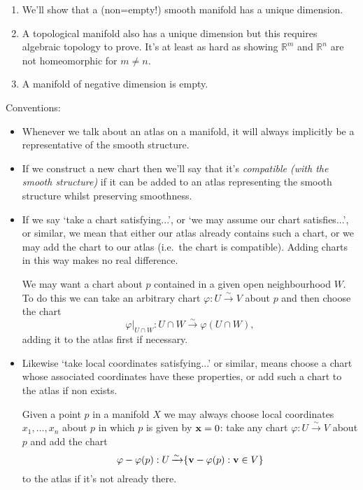\documentclass[a4paper,11pt]{article}
\begin{document}
	\begin{rmk}
		\begin{enumerate}
			\item We'll show that a (non=empty!) smooth manifold has a unique dimension.
			\item A topological manifold also has a unique dimension but this requires algebraic topology to prove. It's at least as hard as showing $\mathbb{R}^m$ and $\mathbb{R}^n$ are not homeomorphic for $m \neq n$.
			\item A manifold of negative dimension is empty.
		\end{enumerate}
	\end{rmk}

	Conventions:
	\begin{itemize}
		\item Whenever we talk about an atlas on a manifold, it will always implicitly be a representative of the smooth structure.
		\item If we construct a new chart then we'll say that it's \emph{compatible (with the smooth structure)} if it can be added to an atlas representing the smooth structure whilst preserving smoothness.
		\item If we say `take a chart satisfying...', or `we may assume our chart satisfies...', or similar, we mean that either our atlas already contains such a chart, or we may add the chart to our atlas (i.e.\ the chart is compatible). Adding charts in this way makes no real difference.
		\begin{ex}
			We may want a chart about $p$ contained in a given open neighbourhood $W$. To do this we can take an arbitrary chart $\varphi: U \xrightarrow{\sim} V$ about $p$ and then choose the chart
			\[
				\varphi|_{U\cap W} : U \cap W \xrightarrow{\sim} \varphi(U \cap W),
			\]
			adding it to the atlas first if necessary. 
		\end{ex}
		\item Likewise `take local coordinates satisfying...' or similar, means choose a chart whose associated coordinates have these properties, or add such a chart to the atlas if non exists.
		\begin{ex}
			Given a point $p$ in a manifold $X$ we may always choose local coordinates $x_1, \dots, x_n$ about $p$ in which $p$ is given by $\vb{x} = 0$: take any chart $\varphi: U \xrightarrow{\sim} V$ about $p$ and add the chart
			\[
				\varphi - \varphi(p): U \operatorname{\xrightarrow{\sim}} \{\vb{v} - \varphi(p): \vb{v}\in V\}
			\]
			 to the atlas if it's not already there.
		\end{ex}
	\end{itemize}
\end{document}
